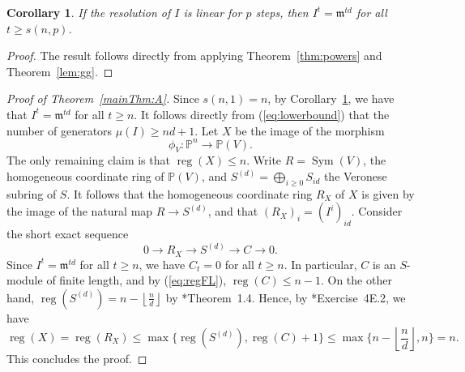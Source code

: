 \documentclass[11pt,letterpaper,reqno]{amsart}
\newcommand{\m}{\mathfrak{m}}
\newcommand{\Sym}{\operatorname{Sym}}
\newcommand{\reg}{\operatorname{reg}}
\def\PP{{\mathbb P}}
\def\lra{\longrightarrow}
\newtheorem{corollary}[theorem]{Corollary}
\theoremstyle{definition}
\numberwithin{equation}{section}
\begin{document}
\begin{corollary}\label{cor:thmA}
    If the resolution of $I$ is linear for $p$ steps, then $I^t = \m^{td}$ for all $t \ge s(n,p)$.
\end{corollary}
\begin{proof}
    The result follows directly from applying Theorem~\ref{thm:powers} and Theorem~\ref{lem:gg}.
\end{proof}
\begin{proof}[Proof of Theorem~\ref{mainThm:A}]
    Since $s(n,1) = n$, by Corollary~\ref{cor:thmA}, we have that $I^t = \m^{td}$ for all $t \ge n$. It follows directly from (\ref{eq:lowerbound}) that the number of generators $\mu(I) \ge nd + 1$. Let $X$ be the image of the morphism
    \[\phi_V \colon \PP^n \lra \PP(V).\]
    The only remaining claim is that $\reg(X) \le n$. Write $R = \Sym(V)$, the homogeneous coordinate ring of $\PP(V)$, and $S^{(d)} = \bigoplus_{i\ge0} S_{id}$ the Veronese subring of $S$. It follows that the homogeneous coordinate ring $R_X$ of $X$ is given by the image of the natural map $R \lra S^{(d)}$, and that $(R_X)_i = (I^i)_{id}$. Consider the short exact sequence
    \[0 \lra R_X \lra S^{(d)} \lra C \lra 0.\]
    Since $I^t = \m^{td}$ for all $t \ge n$, we have $C_{t} = 0$ for all $t \ge n$. In particular, $C$ is an $S$-module of finite length, and by (\ref{eq:regFL}), $\reg(C) \le n - 1$. On the other hand, $\reg(S^{(d)}) =n - \left\lfloor \frac{n}{d}\right\rfloor$ by \cite{CM}*{{Theorem~1.4}}. Hence, by \cite{DE-syzygies}*{Exercise~4E.2}, we have
    \[\reg(X) = \reg(R_X) \le \max\{\reg(S^{(d)}),\reg(C)+1\} \le \max\{n - \left\lfloor \frac{n}{d}\right\rfloor,n\} = n.\]
    This concludes the proof.
\end{proof}
\end{document}
